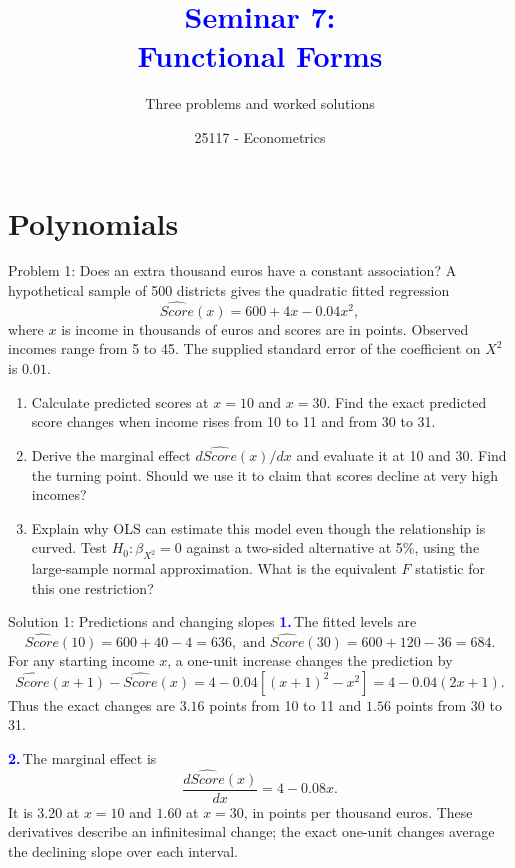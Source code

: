 \documentclass[notes,10pt, aspectratio=169]{beamer}
\title[]{\textcolor{blue}{Seminar 7:\\Functional Forms}}
\subtitle{Three problems and worked solutions}
\author{25117 - Econometrics}
\institute[shortinst]{Universitat Pompeu Fabra}
\date{}
\newif\ifshowsolutions
\newcommand{\answerpart}[1]{\textcolor{blue}{\textbf{#1.}}\,}
\begin{document}
\begin{frame}[plain]
\maketitle
\end{frame}

\section{Polynomials}
\begin{frame}{Problem 1: Does an extra thousand euros have a constant association?}
\small
A hypothetical sample of 500 districts gives the quadratic fitted regression
\[
\widehat{Score}(x)=600+4x-0.04x^2,
\]
where $x$ is income in thousands of euros and scores are in points. Observed incomes range from 5 to 45. The supplied standard error of the coefficient on $X^2$ is $0.01$.
\begin{enumerate}
\item Calculate predicted scores at $x=10$ and $x=30$. Find the exact predicted score changes when income rises from 10 to 11 and from 30 to 31.
\item Derive the marginal effect $d\widehat{Score}(x)/dx$ and evaluate it at 10 and 30. Find the turning point. Should we use it to claim that scores decline at very high incomes?
\item Explain why OLS can estimate this model even though the relationship is curved. Test $H_0:\beta_{X^2}=0$ against a two-sided alternative at 5\%, using the large-sample normal approximation. What is the equivalent $F$ statistic for this one restriction?
\end{enumerate}
\end{frame}

\ifshowsolutions
\begin{frame}{Solution 1: Predictions and changing slopes}
\small
\answerpart{1}The fitted levels are
\[
\widehat{Score}(10)=600+40-4=636,\text{ and }
\widehat{Score}(30)=600+120-36=684.
\]
For any starting income $x$, a one-unit increase changes the prediction by
\[
\widehat{Score}(x+1)-\widehat{Score}(x)
=4-0.04[(x+1)^2-x^2]=4-0.04(2x+1).
\]
Thus the exact changes are $3.16$ points from 10 to 11 and $1.56$ points from 30 to 31.
\par\medskip
\answerpart{2}The marginal effect is
\[
\frac{d\widehat{Score}(x)}{dx}=4-0.08x.
\]
It is $3.20$ at $x=10$ and $1.60$ at $x=30$, in points per thousand euros. These derivatives describe an infinitesimal change; the exact one-unit changes average the declining slope over each interval.
\end{frame}
\end{document}
